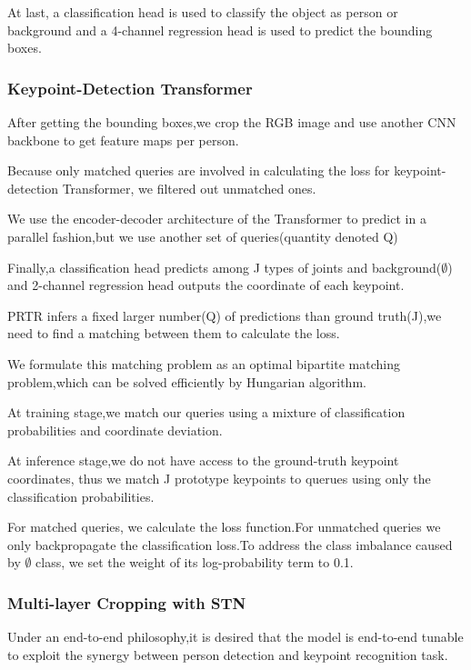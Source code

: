 \documentclass[11pt]{article}
\begin{document}
At last, a classification head is used to classify the object as person or background and a 4-channel regression head is used to predict the bounding boxes.

\subsubsection{Keypoint-Detection Transformer}

After getting the bounding boxes,we crop the RGB image and use another CNN backbone to get feature maps per person.

Because only matched queries are involved in calculating the loss for keypoint-detection Transformer, we filtered out unmatched ones.

We use the encoder-decoder architecture of the Transformer to predict in a parallel fashion,but we use another set of queries(quantity denoted Q)

Finally,a classification head predicts among J types of joints and background($\emptyset$) and 2-channel regression head outputs the coordinate of each keypoint.

PRTR infers a fixed larger number(Q) of predictions than ground truth(J),we need to find a matching between them to calculate the loss.

We formulate this matching problem as an optimal bipartite matching problem,which can be solved efficiently by Hungarian algorithm.

At training stage,we match our queries using a mixture of classification probabilities and coordinate deviation.

At inference stage,we do not have access to the ground-truth keypoint coordinates, thus we match J prototype keypoints to querues using only the classification probabilities.

For matched queries, we calculate the loss function.For unmatched queries we only backpropagate the classification loss.To address the class imbalance caused by $\emptyset$ class, we set the weight of its log-probability term to 0.1.

\subsubsection{Multi-layer Cropping with STN}

Under an end-to-end philosophy,it is desired that the model is end-to-end tunable to exploit the synergy between person detection and keypoint recognition task.
\end{document}
